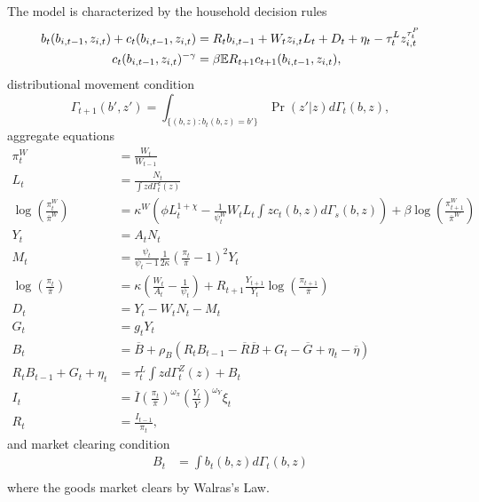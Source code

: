 The model is characterized by the household decision rules
\begin{align*}
    b_{t} (b_{i, t-1}, z_{i, t}) + c_{t} (b_{i, t-1}, z_{i, t}) &= R_t b_{i, t-1} + W_t z_{i, t} L_t + D_t + \eta_t - \tau_t^L z_{i, t}^{\tau_t^P} \\
    c_{t} (b_{i, t-1}, z_{i, t})^{-\gamma} &= \beta \mathbb{E} R_{t + 1} c_{t + 1} (b_{i, t-1}, z_{i, t}), \\
\end{align*}
distributional movement condition
\begin{equation*}
    \Gamma_{t + 1} (b', z') = \int_{\{(b, z) : b_t(b, z) = b'\}} \Pr (z' | z) d \Gamma_t (b, z),
\end{equation*}
aggregate equations
\begin{align*}
    \pi_t^W &= \frac{W_t}{W_{t-1}} \\
    L_t &= \frac{N_t}{\int z d\Gamma_t^z(z)} \\
    \log \left(\frac{\pi_t^W}{\overline{\pi}^W}\right) &= \kappa^W \left(\phi L_t^{1 + \chi} - \frac{1}{\psi^W_t} W_t L_t \int z c_t(b, z) d\Gamma_s (b, z)\right) + \beta \log \left(\frac{\pi_{t+1}^W}{\overline{\pi}^W}\right) \\
    Y_t &= A_t N_t \\
    M_t &= \frac{\psi_t}{\psi_t - 1} \frac{1}{2 \kappa} \left( \frac{\pi_t}{\overline{\pi}} - 1 \right)^2 Y_t \\
    \log \left(\frac{\pi_t}{\overline{\pi}}\right) &= \kappa \left(\frac{W_t}{A_t} - \frac{1}{\psi_t}\right) + R_{t+1} \frac{Y_{t+1}}{Y_t} \log\left(\frac{\pi_{t+1}}{\overline{\pi}}\right) \\
    D_t &= Y_t - W_t N_t - M_t \\
    G_t &= g_t Y_t \\
    B_t &= \overline{B} + \rho_B \left(R_t B_{t-1} - \overline{R} \overline{B} + G_t - \overline{G} + \eta_t - \overline{\eta}\right) \\
    R_t B_{t - 1} + G_t + \eta_t &= \tau_t^L \int z d \Gamma_t^Z (z) + B_t \\
    I_t &= \overline{I} \left(\frac{\pi_t}{\overline{\pi}}\right)^{\omega_\pi} \left(\frac{Y_t}{\overline{Y}}\right)^{\omega_Y} \xi_t \\
    R_t &= \frac{I_{t - 1}}{\pi_t},
\end{align*}
and market clearing condition
\begin{align*}
    B_t &= \int b_t (b, z) d \Gamma_t (b, z) \\
\end{align*}
where the goods market clears by Walras's Law.

